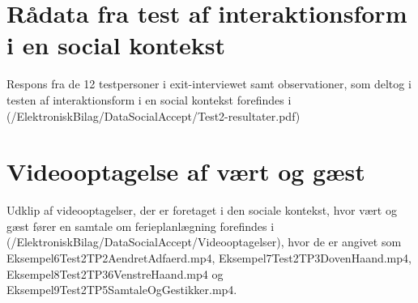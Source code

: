 \section{Rådata fra test af interaktionsform i en social kontekst}
\label{app:ResultaterSocialAccept}
%
Respons fra de 12 testpersoner i exit-interviewet samt observationer, som deltog i testen af interaktionsform i en social kontekst forefindes i (/ElektroniskBilag/DataSocialAccept/Test2-resultater.pdf)
%
\section{Videooptagelse af vært og gæst}
\label{app:VideooptagelseVaertOgGaest}
%
Udklip af videooptagelser, der er foretaget i den sociale kontekst, hvor vært og gæst fører en samtale om ferieplanlægning forefindes i (/ElektroniskBilag/DataSocialAccept/Videooptagelser), hvor de er angivet som Eksempel6Test2TP2AendretAdfaerd.mp4, Eksempel7Test2TP3DovenHaand.mp4, Eksempel8Test2TP36VenstreHaand.mp4 og Eksempel9Test2TP5SamtaleOgGestikker.mp4.
%

